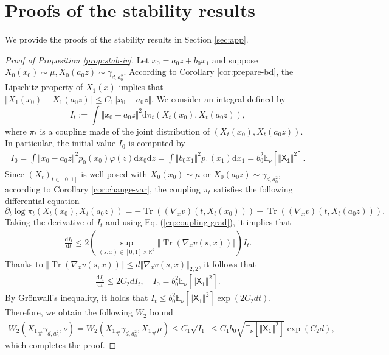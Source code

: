 \documentclass[twoside,11pt]{article}
\def\sR{{\mathbb{R}}}
\newcommand{\E}{\mathbb{E}}
\DeclareMathOperator{\Tr}{Tr}
\def\paref#1{(\ref{#1})}
\newcommand{\diff}{\mathrm{d}}
\numberwithin{equation}{section}
\begin{document}
\section{Proofs of the stability results}

We provide the proofs of the stability results in Section \ref{sec:app}.

\begin{proof} [Proof of Proposition \ref{prop:stab-iv}]
Let $x_0 = a_0 z + b_0 x_1$ and suppose $X_0(x_0) \sim \mu, X_0(a_0 z) \sim \gamma_{d, a_0^2}$.
According to Corollary \ref{cor:prepare-bd}, the Lipschitz property of $X_1(x)$ implies that $\Vert X_1(x_0) - X_1(a_0 z) \Vert \le C_1 \Vert x_0 - a_0 z \Vert$.
We consider an integral defined by
\begin{equation*}
    I_t := \int \Vert x_0 - a_0 z \Vert^2 \diff \pi_t (X_t(x_0), X_t(a_0 z)),
\end{equation*}
where $\pi_t$ is a coupling made of the joint distribution of $(X_t(x_0), X_t(a_0 z))$.
In particular, the initial value $I_0$ is computed by
\begin{align*}
    I_0 = \int \Vert x_0 - a_0 z \Vert^2 p_0(x_0) \varphi(z) \diff x_0 \diff z
        = \int \Vert b_0 x_1 \Vert^2 p_1(x_1) \diff x_1
        = b_0^2 \E_{\nu} [\Vert \mathsf{X_1} \Vert^2].
\end{align*}
Since $(X_t)_{t \in [0, 1]}$ is well-posed with $X_0(x_0) \sim \mu$ or $X_0(a_0 z) \sim \gamma_{d, a_0^2}$, according to Corollary \ref{cor:change-var}, the coupling $\pi_t$ satisfies the following differential equation
\begin{equation} \label{eq:coupling-grad}
    \partial_t \log \pi_t (X_t(x_0), X_t(a_0 z)) = - \Tr ((\nabla_x v) (t, X_t(x_0))) - \Tr ((\nabla_x v) (t, X_t(a_0 z))).
\end{equation}
Taking the derivative of $I_t$ and using Eq. \paref{eq:coupling-grad}, it implies that
\begin{align*}
    \frac{\diff I_t}{\diff t} \le
    2 \left( \sup_{(s, x) \in [0, 1] \times \sR^d} \Vert \Tr (\nabla_x v(s, x)) \Vert \right) I_t.
\end{align*}
Thanks to $\Vert \Tr (\nabla_x v(s, x)) \Vert \le d \Vert \nabla_x v(s, x) \Vert_{2,2}$, it follows that
\begin{align*}
    \frac{\diff I_t}{\diff t} \le 2 C_2 d I_t, \quad I_0 = b_0^2 \E_{\nu} [\Vert \mathsf{X_1} \Vert^2].
\end{align*}
By Gr{\"o}nwall's inequality, it holds that
$I_t \le b_0^2 \E_{\nu} [\Vert \mathsf{X_1} \Vert^2] \exp (2 C_2 d t)$.
Therefore, we obtain the following $W_2$ bound
\begin{align*}
    W_2({X_1}_{\#} \gamma_{d, a_0^2}, \nu)
    = W_2({X_1}_{\#} \gamma_{d, a_0^2}, {X_1}_{\#} \mu)
    \le C_1 \sqrt{I_1} ~ \le C_1 b_0 \sqrt{\E_{\nu} [\Vert \mathsf{X_1} \Vert^2]} \exp (C_2 d),
\end{align*}
which completes the proof.
\end{proof}
\end{document}
